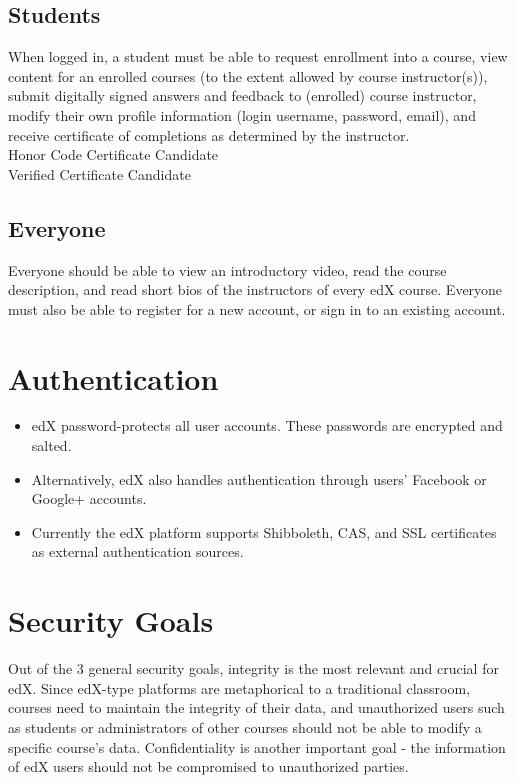 \documentclass[11pt]{article}
\begin{document}
\subsection{Students}
When logged in, a student must be able to request enrollment into a course, view content for an  enrolled courses (to the extent allowed by course instructor(s)), submit digitally signed answers and feedback to (enrolled) course instructor, modify their own profile information (login username, password, email), and receive certificate of completions as determined by the instructor.\\

Honor Code Certificate Candidate\\
Verified Certificate Candidate\\

\subsection{Everyone}
Everyone should be able to view an introductory video, read the course description, and read short bios of the instructors of every edX course. Everyone must also be able to register for a new account, or sign in to an existing account.

\section{Authentication}
\begin{itemize}
\item edX password-protects all user accounts. These passwords are encrypted and salted. 
\item Alternatively, edX also handles authentication through users' Facebook or Google+ accounts.
\item Currently the edX platform supports Shibboleth, CAS, and SSL certificates as external authentication sources.
\end{itemize}

\section{Security Goals}
Out of the 3 general security goals, integrity is the most relevant and crucial for edX. Since edX-type platforms are metaphorical to a traditional classroom, courses need to maintain the integrity of their data, and unauthorized users such as students or administrators of other courses should not be able to modify a specific course's data. Confidentiality is another important goal - the information of edX users should not be compromised to unauthorized parties.
\end{document}
